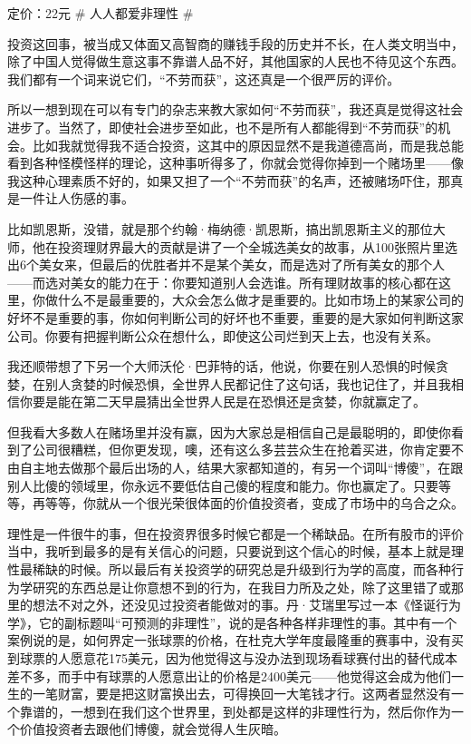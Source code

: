 定价：22元 \# 人人都爱非理性 \#

投资这回事，被当成又体面又高智商的赚钱手段的历史并不长，在人类文明当中，除了中国人觉得做生意这事不靠谱人品不好，其他国家的人民也不待见这个东西。我们都有一个词来说它们，``不劳而获''，这还真是一个很严厉的评价。

所以一想到现在可以有专门的杂志来教大家如何``不劳而获''，我还真是觉得这社会进步了。当然了，即使社会进步至如此，也不是所有人都能得到``不劳而获''的机会。比如我就觉得我不适合投资，这其中的原因显然不是我道德高尚，而是我总能看到各种怪模怪样的理论，这种事听得多了，你就会觉得你掉到一个赌场里------像我这种心理素质不好的，如果又担了一个``不劳而获''的名声，还被赌场吓住，那真是一件让人伤感的事。

比如凯恩斯，没错，就是那个约翰·梅纳德·凯恩斯，搞出凯恩斯主义的那位大师，他在投资理财界最大的贡献是讲了一个全城选美女的故事，从100张照片里选出6个美女来，但最后的优胜者并不是某个美女，而是选对了所有美女的那个人------而选对美女的能力在于：你要知道别人会选谁。所有理财故事的核心都在这里，你做什么不是最重要的，大众会怎么做才是重要的。比如市场上的某家公司的好坏不是重要的事，你如何判断公司的好坏也不重要，重要的是大家如何判断这家公司。你要有把握判断公众在想什么，即使这公司烂到天上去，也没有关系。

我还顺带想了下另一个大师沃伦·巴菲特的话，他说，你要在别人恐惧的时候贪婪，在别人贪婪的时候恐惧，全世界人民都记住了这句话，我也记住了，并且我相信你要是能在第二天早晨猜出全世界人民是在恐惧还是贪婪，你就赢定了。

但我看大多数人在赌场里并没有赢，因为大家总是相信自己是最聪明的，即使你看到了公司很糟糕，但你更发现，噢，还有这么多芸芸众生在抢着买进，你肯定要不由自主地去做那个最后出场的人，结果大家都知道的，有另一个词叫``博傻''，在跟别人比傻的领域里，你永远不要低估自己傻的程度和能力。你也赢定了。只要等等，再等等，你就从一个很光荣很体面的价值投资者，变成了市场中的乌合之众。

理性是一件很牛的事，但在投资界很多时候它都是一个稀缺品。在所有股市的评价当中，我听到最多的是有关信心的问题，只要说到这个信心的时候，基本上就是理性最稀缺的时候。所以最后有关投资学的研究总是升级到行为学的高度，而各种行为学研究的东西总是让你意想不到的行为，在我目力所及之处，除了这里错了或那里的想法不对之外，还没见过投资者能做对的事。丹·艾瑞里写过一本《怪诞行为学》，它的副标题叫``可预测的非理性''，说的是各种各样非理性的事。其中有一个案例说的是，如何界定一张球票的价格，在杜克大学年度最隆重的赛事中，没有买到球票的人愿意花175美元，因为他觉得这与没办法到现场看球赛付出的替代成本差不多，而手中有球票的人愿意出让的价格是2400美元------他觉得这会成为他们一生的一笔财富，要是把这财富换出去，可得换回一大笔钱才行。这两者显然没有一个靠谱的，一想到在我们这个世界里，到处都是这样的非理性行为，然后你作为一个价值投资者去跟他们博傻，就会觉得人生灰暗。

